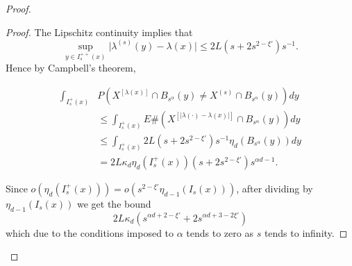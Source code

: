\begin{proof}
\begin{proof}
The Lipschitz continuity implies that $$\sup_{y\in I_s^{++}(x)}\vert \lambda^{(s)}(y)-\lambda(x)\vert\leq 2L(s+2s^{2-\xi'})s^{-1}. $$ Hence by Campbell's theorem,

\begin{align}
\int_{I^+_s(x)}&P(X^{[\lambda (x)]}\cap B_{s^\alpha}(y)\neq X^{(s)}\cap B_{s^\alpha}(y))dy\nonumber\\
&\leq\int_{I^+_s(x)} E\#(X^{[\vert \lambda(\cdot)-\lambda(x)\vert]}\cap B_{s^\alpha}(y))dy\nonumber\\
&\leq\int_{I^+_s(x)}2L(s+2s^{2-\xi'})s^{-1} \eta_d(B_{s^\alpha}(y))dy\nonumber\\
&=2L\kappa_d  \eta_d(I^+_s(x))(s+2s^{2-\xi'})s^{\alpha d -1}.\nonumber
\end{align}

Since $o(\eta_{d}(I^+_s(x)))=o(s^{2-\xi'}\eta_{d-1}(I_s(x)))$, after dividing by $\eta_{d-1}(I_s(x))$ we get the bound
$$2L\kappa_d  (s^{\alpha d+2-\xi'}+2s^{\alpha d+3-2\xi'})$$ which due to the conditions imposed to $\alpha$ tends to zero as $s$ tends to infinity.


\end{proof}
\end{proof}
